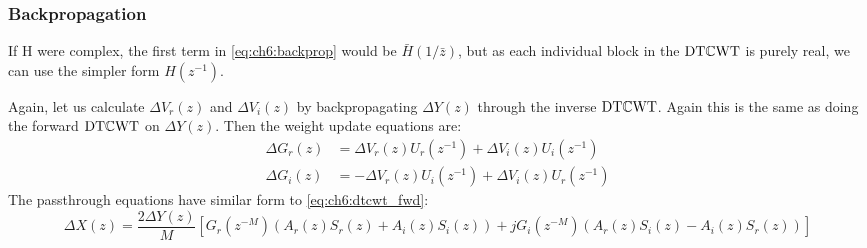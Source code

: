\subsubsection{Backpropagation}\label{sec:ch6:dtcwt_update}
If H were complex, the first term in \autoref{eq:ch6:backprop} would be
$\bar{H}(1/\bar{z})$, but as each individual block in the $\mathrm{DT}\mathbb{C}\mathrm{WT}$ is purely
real, we can use the simpler form $H(z^{-1})$. 

Again, let us calculate $\Delta V_r(z)$ and $\Delta V_i(z)$ by backpropagating
$\Delta Y(z)$ through the inverse $\mathrm{DT}\mathbb{C}\mathrm{WT}$. Again this is the same as doing the
forward $\mathrm{DT}\mathbb{C}\mathrm{WT}$ on $\Delta Y(z)$. Then the weight update equations are:
\begin{align}
  \Delta G_r(z) &= \Delta V_r(z) U_r(z^{-1}) + \Delta V_i(z) U_i(z^{-1})  \label{eq:ch6:gr_update}\\
  \Delta G_i(z) &=  -\Delta V_r(z) U_i(z^{-1}) + \Delta V_i(z) U_r(z^{-1})  \label{eq:ch6:gi_update} 
\end{align}
%
The passthrough equations have similar form to \eqref{eq:ch6:dtcwt_fwd}:
\begin{equation}\label{eq:ch6:dtcwt_passthrough}
    \Delta X(z) = \frac{2\Delta Y(z)}{M} \left[G_r(z^{-M})\left( A_r(z)S_r(z) + A_i(z)S_i(z) \right)\right. + 
      \left. jG_i(z^{-M}) \left(A_r(z)S_i(z) - A_i(z)S_r(z) \right) \right] 
\end{equation}

\begin{figure}[t]
  \centering
  \hspace{1cm}
  \label{fig:ch6:dtcwt_bands}
\end{figure}

